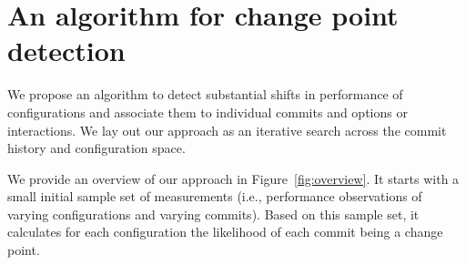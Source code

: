 \documentclass[sigconf]{acmart}
\begin{document}

	
	\section{An algorithm for change point detection}\label{sec:cpmodel}
	We propose an algorithm to detect substantial shifts in performance of configurations and associate them to individual commits and options or interactions. We lay out our approach as an iterative search across the commit history and configuration space. 
	
	We provide an overview of our approach in Figure~\ref{fig:overview}. 
	It starts with a small initial sample set of measurements (i.e., performance observations of varying configurations and varying commits). 
	Based on this sample set, it calculates for each configuration the likelihood of each commit being a change point. 
	
\end{document}
